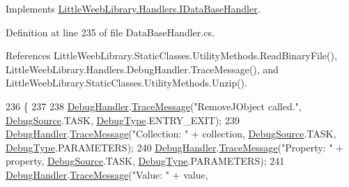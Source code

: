 Implements \mbox{\hyperlink{interface_little_weeb_library_1_1_handlers_1_1_i_data_base_handler_a76b8da1f75749b16e095dc3d635cebdf}{Little\+Weeb\+Library.\+Handlers.\+I\+Data\+Base\+Handler}}.



Definition at line 235 of file Data\+Base\+Handler.\+cs.



References Little\+Weeb\+Library.\+Static\+Classes.\+Utility\+Methods.\+Read\+Binary\+File(), Little\+Weeb\+Library.\+Handlers.\+Debug\+Handler.\+Trace\+Message(), and Little\+Weeb\+Library.\+Static\+Classes.\+Utility\+Methods.\+Unzip().


\begin{DoxyCode}
236         \{
237 
238             \mbox{\hyperlink{class_little_weeb_library_1_1_handlers_1_1_data_base_handler_aa474a1f934032623ffb3ae5eb156148b}{DebugHandler}}.\mbox{\hyperlink{interface_little_weeb_library_1_1_handlers_1_1_i_debug_handler_a2e405bc3492e683cd3702fae125221bc}{TraceMessage}}(\textcolor{stringliteral}{"RemoveJObject called."}, 
      \mbox{\hyperlink{namespace_little_weeb_library_1_1_handlers_a2a6ca0775121c9c503d58aa254d292be}{DebugSource}}.TASK, \mbox{\hyperlink{namespace_little_weeb_library_1_1_handlers_ab66019ed40462876ec4e61bb3ccb0a62}{DebugType}}.ENTRY\_EXIT);
239             \mbox{\hyperlink{class_little_weeb_library_1_1_handlers_1_1_data_base_handler_aa474a1f934032623ffb3ae5eb156148b}{DebugHandler}}.\mbox{\hyperlink{interface_little_weeb_library_1_1_handlers_1_1_i_debug_handler_a2e405bc3492e683cd3702fae125221bc}{TraceMessage}}(\textcolor{stringliteral}{"Collection: "} + collection, 
      \mbox{\hyperlink{namespace_little_weeb_library_1_1_handlers_a2a6ca0775121c9c503d58aa254d292be}{DebugSource}}.TASK, \mbox{\hyperlink{namespace_little_weeb_library_1_1_handlers_ab66019ed40462876ec4e61bb3ccb0a62}{DebugType}}.PARAMETERS);
240             \mbox{\hyperlink{class_little_weeb_library_1_1_handlers_1_1_data_base_handler_aa474a1f934032623ffb3ae5eb156148b}{DebugHandler}}.\mbox{\hyperlink{interface_little_weeb_library_1_1_handlers_1_1_i_debug_handler_a2e405bc3492e683cd3702fae125221bc}{TraceMessage}}(\textcolor{stringliteral}{"Property: "} + property, 
      \mbox{\hyperlink{namespace_little_weeb_library_1_1_handlers_a2a6ca0775121c9c503d58aa254d292be}{DebugSource}}.TASK, \mbox{\hyperlink{namespace_little_weeb_library_1_1_handlers_ab66019ed40462876ec4e61bb3ccb0a62}{DebugType}}.PARAMETERS);
241             \mbox{\hyperlink{class_little_weeb_library_1_1_handlers_1_1_data_base_handler_aa474a1f934032623ffb3ae5eb156148b}{DebugHandler}}.\mbox{\hyperlink{interface_little_weeb_library_1_1_handlers_1_1_i_debug_handler_a2e405bc3492e683cd3702fae125221bc}{TraceMessage}}(\textcolor{stringliteral}{"Value: "} + value, 

\end{DoxyCode}
